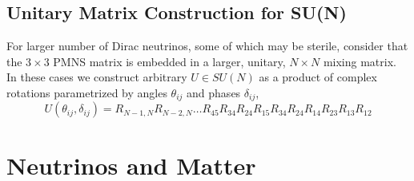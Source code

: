 \documentclass[main.tex]{subfiles}
\begin{document}
\subsection{Unitary Matrix Construction for SU(N)}

For larger number of Dirac neutrinos, some of which may be sterile, consider that the $3\times 3$ PMNS matrix is embedded in a larger, unitary, $N\times N$ mixing matrix.
In these cases we construct arbitrary $U\in SU(N)$ as a product of complex rotations parametrized by angles $\theta_{ij}$ and phases $\delta_{ij}$, 
\begin{equation}
    U(\theta_{ij}, \delta_{ij}) = R_{N-1,N}R_{N-2,N}\ldots R_{45}R_{34}R_{24}R_{15}R_{34}R_{24}R_{14}R_{23}R_{13}R_{12}
\end{equation}
\fi

\section{Neutrinos and Matter}

\end{document}

